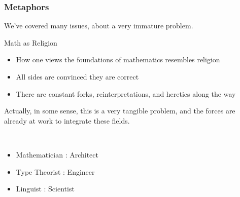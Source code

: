 \documentclass[9pt]{beamer}
\begin{document}
\begin{frame}
\frametitle{Metaphors}

We've covered many issues, about a very immature problem.

\begin{block}{Math as Religion}
\begin{itemize}
\item How one views the foundations of mathematics resembles religion
\item All sides are convinced they are correct
\item There are constant forks, reinterpretations, and heretics along the way
\end{itemize}
\end{block}

Actually, in some sense, this is a very tangible problem, and the forces are already at work to
integrate these fields.

\begin{block}{~}
\begin{itemize}
\item Mathematician : Architect
\item Type Theorist : Engineer
\item Linguist : Scientist
\end{itemize}
\end{block}

\end{frame}
\end{document}
